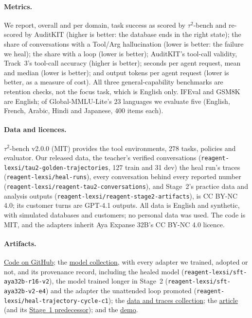 \documentclass[11pt]{article}
\begin{document}
\paragraph{Metrics.} We report, overall and per domain, task success as scored by $\tau^2$-bench and re-scored by AuditKIT (higher is better: the database ends in the right state); the share of conversations with a Tool/Arg hallucination (lower is better: the failure we heal); the share with a loop (lower is better); AuditKIT's tool-call validity, Track~3's tool-call accuracy (higher is better); seconds per agent request, mean and median (lower is better); and output tokens per agent request (lower is better, as a measure of cost). All three general-capability benchmarks are retention checks, not the focus task, which is English only. IFEval \citep{Zhou2023IFEval} and GSM8K \citep{Cobbe2021GSM8K} are English; of Global-MMLU-Lite's 23 languages \citep{Singh2024GlobalMMLU} we evaluate five (English, French, Arabic, Hindi and Japanese, 400 items each).

\paragraph{Data and licences.} $\tau^2$-bench v2.0.0 (MIT) provides the tool environments, 278 tasks, policies and evaluator. Our released data, the teacher's verified conversations (\texttt{reagent-lexsi/\allowbreak tau2-golden-trajectories}, 127 train and 31 dev) the heal run's traces (\texttt{reagent-lexsi/\allowbreak heal-runs}), every conversation behind every reported number (\texttt{reagent-lexsi/\allowbreak reagent-tau2-conversations}), and Stage~2's practice data and analysis outputs (\texttt{reagent-lexsi/\allowbreak reagent-stage2-artifacts}), is CC BY-NC 4.0; its customer turns are GPT-4.1 outputs. All data is English and synthetic, with simulated databases and customers; no personal data was used. The code is MIT, and the adapters inherit Aya Expanse 32B's CC BY-NC 4.0 licence.

\paragraph{Artifacts.} \href{https://github.com/CharlieGalvin/lexsi-labs-reflexive-agent}{Code on GitHub}; the \href{https://huggingface.co/collections/reagent-lexsi/reflexive-agents-models}{model collection}, with every adapter we trained, adopted or not, and its provenance record, including the healed model (\texttt{reagent-lexsi/sft-aya32b-r16-v2}), the model trained longer in Stage~2 (\texttt{reagent-lexsi/sft-aya32b-v2-e4}) and the adapter the unattended loop promoted (\texttt{reagent-lexsi/heal-trajectory-cycle-c1}); the \href{https://huggingface.co/collections/reagent-lexsi/reflexive-agents-data-and-traces}{data and traces collection}; the \href{https://huggingface.co/blog/cg3849/reflexive-agents-full-story}{article} (and its \href{https://huggingface.co/blog/cg3849/reflexive-agents}{Stage~1 predecessor}); and the \href{https://huggingface.co/spaces/reagent-lexsi/spot-the-hallucination}{demo}.
\end{document}
